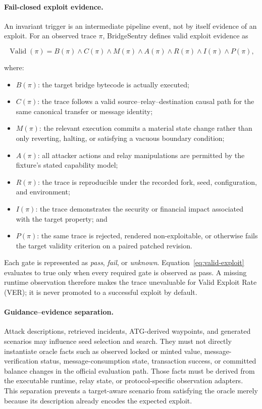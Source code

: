 \paragraph{Fail-closed exploit evidence.}
An invariant trigger is an intermediate pipeline event, not by itself evidence of an exploit. For an observed trace $\pi$, BridgeSentry defines valid exploit evidence as

\begin{equation}
\operatorname{Valid}(\pi)
= B(\pi)\land C(\pi)\land M(\pi)\land A(\pi)\land R(\pi)\land I(\pi)\land P(\pi),
\label{eq:valid-exploit}
\end{equation}

where:

\begin{itemize}
    \item $B(\pi)$: the target bridge bytecode is actually executed;
    \item $C(\pi)$: the trace follows a valid source--relay--destination causal path for the same canonical transfer or message identity;
    \item $M(\pi)$: the relevant execution commits a material state change rather than only reverting, halting, or satisfying a vacuous boundary condition;
    \item $A(\pi)$: all attacker actions and relay manipulations are permitted by the fixture's stated capability model;
    \item $R(\pi)$: the trace is reproducible under the recorded fork, seed, configuration, and environment;
    \item $I(\pi)$: the trace demonstrates the security or financial impact associated with the target property; and
    \item $P(\pi)$: the same trace is rejected, rendered non-exploitable, or otherwise fails the target validity criterion on a paired patched revision.
\end{itemize}

Each gate is represented as \emph{pass}, \emph{fail}, or \emph{unknown}. Equation~\ref{eq:valid-exploit} evaluates to true only when every required gate is observed as pass. A missing runtime observation therefore makes the trace unevaluable for Valid Exploit Rate (VER); it is never promoted to a successful exploit by default.

\paragraph{Guidance--evidence separation.}
Attack descriptions, retrieved incidents, ATG-derived waypoints, and generated scenarios may influence seed selection and search. They must not directly instantiate oracle facts such as observed locked or minted value, message-verification status, message-consumption state, transaction success, or committed balance changes in the official evaluation path. Those facts must be derived from the executable runtime, relay state, or protocol-specific observation adapters. This separation prevents a target-aware scenario from satisfying the oracle merely because its description already encodes the expected exploit.

